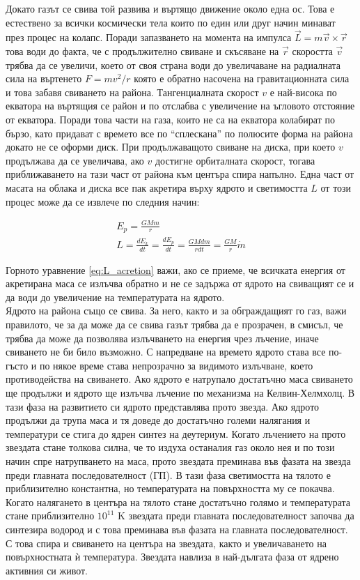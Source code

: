 \documentclass[a4paper,12pt]{article}
\begin{document}
Докато газът се свива той развива и въртящо движение около една ос. Това е естествено за всички космически тела които по един или друг начин минават през процес на колапс. Поради запазването на момента на импулса $\Vec{L} = m\Vec{v} \times \Vec{r}$ това води до факта, че с продължително свиване и скъсяване на $\Vec{r}$ скоростта $\Vec{v}$ трябва да се увеличи, което от своя страна води до увеличаване на радиалната сила на въртенето $F=mv^2/r$ която е обратно насочена на гравитационната сила и това забавя свиването на района. Тангенциалната скорост $v$ е най-висока по екватора на въртящия се район и по отслабва с увеличение на ъгловото отстояние от екватора. Поради това части на газа, които не са на екватора колабират по бързо, като придават с времето все по ``сплескана'' по полюсите форма на района докато не се оформи диск. При продължаващото свиване на диска, при което $v$ продължава да се увеличава, ако $v$ достигне орбиталната скорост, тогава приближаването на тази част от района към центъра спира напълно. Една част от масата на облака и диска все пак акретира върху ядрото и светимостта $L$ от този процес може да се извлече по следния начин: 

\begin{gather}
    E_p = \frac{GMm}{r}\\
    L = \frac{dE_k}{dt} = \frac{dE_p}{dt} = \frac{GM dm}{rdt} = \frac{GM}{r} \dot{m}
    \label{eq:L_acretion}
\end{gather}

Горното уравнение \eqref{eq:L_acretion} важи, ако се приеме, че всичката енергия от акретирана маса се излъчва обратно и не се задържа от ядрото на свиващият се и да води до увеличение на температурата на ядрото.\\ 

Ядрото на района също се свива. За него, както и за обграждащият го газ, важи правилото, че за да може да се свива газът трябва да е прозрачен, в смисъл, че трябва да може да позволява излъчването на енергия чрез лъчение, иначе свиването не би било възможно. С напредване на времето ядрото става все по-гъсто и по някое време става непрозрачно за видимото излъчване, което противодейства на свиването. Ако ядрото е натрупало достатъчно маса свиването ще продължи и ядрото ще излъчва лъчение по механизма на Келвин-Хелмхолц. В тази фаза на развитието си ядрото представлява прото звезда. Ако ядрото продължи да трупа маса и тя доведе до достатъчно големи налягания и температури се стига до ядрен синтез на деутериум. Когато лъчението на прото звездата стане толкова силна, че то издуха останалия газ около нея и по този начин спре натрупването на маса, прото звездата преминава във фазата на звезда преди главната последователност (ГП). В тази фаза светимостта на тялото е приблизително константна, но температурата на повърхността му се покачва. Когато налягането в центъра на тялото стане достатъчно голямо и температурата стане приблизително $10^{11}$ K звездата преди главната последователност започва да синтезира водород и с това преминава във фазата на главната последователност. С това спира и свиването на центъра на звездата, както и увеличаването на повърхностната ѝ температура. Звездата навлиза в най-дългата фаза от ядрено активния си живот. 
\end{document}

